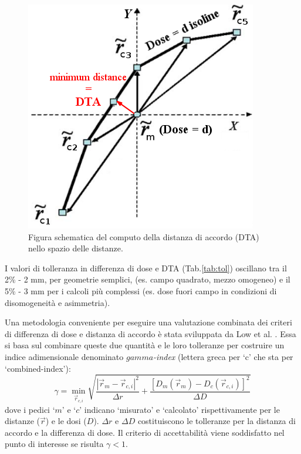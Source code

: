 \begin{figure}
\centering
\includegraphics[width=.5\textwidth]{./cap2/DTA.png}
\caption{Figura schematica del computo della distanza di accordo (DTA) nello spazio delle distanze.}
\label{fig:DTA}
\end{figure}

I valori di tolleranza in differenza di dose e DTA (Tab.\ref{tab:tol}) oscillano tra il 2\% - 2 mm, per geometrie semplici, (es. campo quadrato, mezzo omogeneo) e il 5\% - 3 mm per i calcoli più complessi (es. dose fuori campo in condizioni di disomogeneità e asimmetria).

Una metodologia conveniente per eseguire una valutazione combinata dei criteri di differenza di dose e distanza di accordo è stata sviluppata da Low et al. \cite{Low1998}. Essa si basa sul combinare queste due quantità e le loro tolleranze per costruire un indice adimensionale denominato \textit{$gamma$-index} (lettera greca per `c' che sta per `combined-index'):
\begin{equation}
\gamma = \min_{\vec{r}_{c,i}} \sqrt{\frac{|\vec{r}_{m}-\vec{r}_{c,i}|^2}{\Delta r}   + \frac{\left[D_{m}(\vec{r}_{m})-D_{c}(\vec{r}_{c,i})\right]^2}{\Delta D} }
\label{eq:gamma}
\end{equation}
dove i pedici `$m$' e `$c$' indicano `misurato' e `calcolato' rispettivamente per le distanze ($\vec{r}$) e le dosi ($D$). $\Delta r$ e $\Delta D$ costituiscono le tolleranze per la distanza di accordo e la differenza di dose. Il criterio di accettabilità viene soddisfatto nel punto di interesse se risulta $\gamma < 1$.

